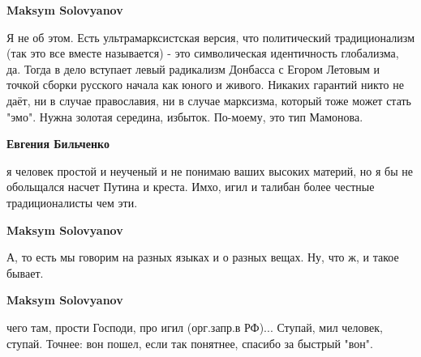 \begin{itemize}
\begin{itemize}
 
\textbf{Maksym Solovyanov} 

Я не об этом. Есть ультрамарксистская версия, что политический традиционализм
(так это все вместе называется) - это символическая идентичность глобализма,
да. Тогда в дело вступает левый радикализм Донбасса с Егором Летовым и точкой
сборки русского начала как юного и живого. Никаких гарантий никто не даёт, ни в
случае православия, ни в случае марксизма, который тоже может стать "эмо".
Нужна золотая середина, избыток. По-моему, это тип Мамонова.


 
\textbf{Евгения Бильченко} 

я человек простой и неученый и не понимаю ваших высоких материй, но я бы не
обольщался насчет Путина и креста. Имхо, игил и талибан более честные
традиционалисты чем эти.


 
\textbf{Maksym Solovyanov} 

А, то есть мы говорим на разных языках и о разных вещах. Ну, что ж, и такое бывает.


 
\textbf{Maksym Solovyanov} 

чего там, прости Господи, про игил (орг.запр.в РФ)... Ступай, мил человек,
ступай. Точнее: вон пошел, если так понятнее, спасибо за быстрый "вон".

\end{itemize}


\end{itemize}

